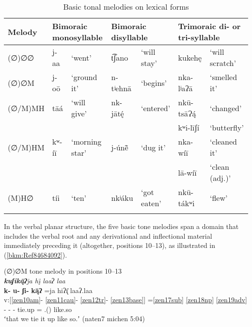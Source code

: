 \documentclass[output=paper]{langscibook}
\begin{document}
\begin{table}
    \centering
    \caption{Basic tonal melodies on lexical forms}
    \label{tab:zenz:key:2}
    \begin{tabular}{p{1.3cm}p{0.8cm}p{1.3cm}p{1.4cm}p{1.4cm}p{1.7cm}p{1.4cm}}
         \lsptoprule
Melody & \multicolumn{2}{p{2.1cm}}{Bimoraic monosyllable} & \multicolumn{2}{p{2.8cm}}{Bimoraic disyllable} & \multicolumn{2}{p{3.1cm}}{Trimoraic di- or tri-syllable}\\\midrule
(∅)∅∅   & j-aa  & `went'        & t͡ʃano         & `will stay'       & kukehę       & `will scratch'\\
(∅)∅M   & j-oō  & `ground it'   & n-tʲehnā      & `begins'          & nka-lʲaʔā       & `smelled it'\\
(∅/M)MH & tāá   & `will give'   & nk-jātę́       & `entered'         & nkū-tsāɁą́       & `changed'\\
        &       &               &               &                   & kʷi-līʃí      & `butterfly'\\
(∅/M)HM & kʷ-íī & `morning star' & j-únẽ̄        & `dug it'          & nka-wíī      & `cleaned it'\\
        &       &               &               &                   & lā-wíī        & `clean (adj.)'\\
(M)H∅   & tíi   & `ten'         & nkʲáku        & `got eaten'       & nkū-tákʷi    & `flew'\\
\lspbottomrule
    \end{tabular}
\end{table}

In the verbal planar structure, the five basic tone melodies span a domain that includes the verbal root and any derivational and inflectional material immediately preceding it (altogether, positions 10{}--13), as illustrated in (\ref{bkm:Ref84684092}).


\ea\label{bkm:Ref84684092}(∅)∅M tone melody in positions 10{}--13\\
\textit{ \textbf{kuʃik\={ą}ʔ}ja hį̄ laaʔ laa}\\
\glll \textbf{k-} \textbf{u-} \textbf{ʃi-} \textbf{k\={ą}ʔ} =ja hiʔ\={\k{ı}} laaʔ.laa\\
v:[\ref{zen10am}{}- \ref{zen11cau}{}- \ref{zen12tr}{}- \ref{zen13base}] =\ref{zen17sub} \ref{zen18np} \ref{zen19adv} \\
\Pot{}- \Caus{}- \Trvz{}- tie.up =\First\Excl{} \Obj.(\Third{}) like.so\\
\glt ʻthat we tie it up like so.ʼ (naten7 michen 5:04)
\z
\end{document}
